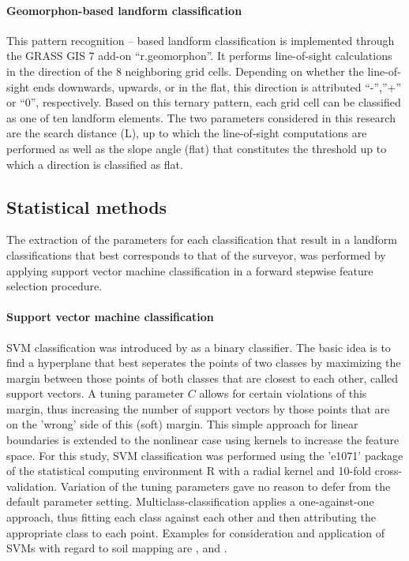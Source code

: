 \documentclass[preprint,12pt,authoryear]{elsarticle}
\begin{document}
\paragraph{Geomorphon-based landform classification \cite{Jasiewicz2013}}
This pattern recognition – based landform classification is implemented through the GRASS GIS 7 add-on “r.geomorphon”. It performs line-of-sight calculations in the direction of the 8 neighboring grid cells.  Depending on whether the line-of-sight ends downwards,  upwards, or in the flat, this direction is attributed “-”,”+” or “0”, respectively.  Based on this ternary pattern, each grid cell can be classified as one of ten landform elements. The two parameters considered in this research are the search distance (L), up to which the line-of-sight computations are performed as well as the slope angle (flat) that constitutes the threshold up to which a direction is classified as flat. 

\subsection{Statistical methods}
The extraction of the parameters for each classification that result in a landform classifications that best corresponds to that of the surveyor, was performed by applying support vector machine classification in a forward stepwise feature selection procedure.
\paragraph{Support vector machine classification}
SVM classification was introduced by \cite{Cortes1995} as a binary classifier. The basic idea is to find a hyperplane that best seperates the points of two classes by maximizing the margin between those points of both classes that are closest to each other, called support vectors. A tuning parameter $C$ allows for certain violations of this margin, thus increasing the number of support vectors by those points that are on the 'wrong' side of this (soft) margin. This simple approach for linear boundaries is extended to the nonlinear case using kernels to increase the feature space. For this study, SVM classification was performed using the 'e1071' package \citep{meyer2014} of the statistical computing environment R \citep{cran2014} with a radial kernel and 10-fold cross-validation. Variation of the tuning parameters gave  no reason to defer from the default parameter setting. Multiclass-classification applies a one-against-one approach, thus fitting each class against each other and then attributing the appropriate class to each point. Examples for consideration and application of SVMs with regard to soil mapping are \cite{Ballabio2009}, \cite{Behrens2006} and \cite{Rossel2010}.
\end{document}
